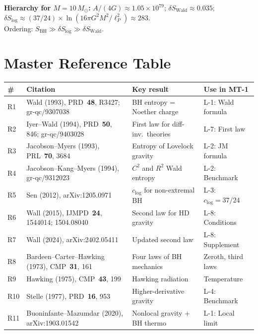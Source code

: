 \documentclass[12pt,a4paper]{article}
\theoremstyle{definition}
\theoremstyle{remark}
\begin{document}
\medskip\noindent
\textbf{Hierarchy for $M = 10\,M_\odot$:}
$A/(4G) \approx 1.05 \times 10^{79}$;\quad
$\delta S_{\mathrm{Wald}} \approx 0.035$;\quad
$\delta S_{\log} \approx (37/24) \times \ln(16\pi G^2 M^2/\ell_P^2)
\approx 283$.\\
Ordering: $S_{\mathrm{BH}} \gg \delta S_{\log} \gg
\delta S_{\mathrm{Wald}}$.


\section{Master Reference Table}
\label{sec:refs}

\begin{center}
\begin{longtable}{p{0.7cm}p{5.5cm}p{3.5cm}p{3.8cm}}
\toprule
\textbf{\#} & \textbf{Citation} & \textbf{Key result}
  & \textbf{Use in MT-1} \\
\midrule
\endhead
R1 & Wald (1993), PRD~\textbf{48}, R3427; gr-qc/9307038
  & BH entropy = Noether charge
  & L-1: Wald formula \\
R2 & Iyer--Wald (1994), PRD~\textbf{50}, 846; gr-qc/9403028
  & First law for diff-inv.\ theories
  & L-7: First law \\
R3 & Jacobson--Myers (1993), PRL~\textbf{70}, 3684
  & Entropy of Lovelock gravity
  & L-2: JM formula \\
R4 & Jacobson--Kang--Myers (1994), gr-qc/9312023
  & $C^2$ and $R^2$ Wald entropy
  & L-2: Benchmark \\
R5 & Sen (2012), arXiv:1205.0971
  & $c_{\log}$ for non-extremal BH
  & L-3: $c_{\log} = 37/24$ \\
R6 & Wall (2015), IJMPD~\textbf{24}, 1544014; 1504.08040
  & Second law for HD gravity
  & L-8: Conditions \\
R7 & Wall (2024), arXiv:2402.05411
  & Updated second law
  & L-8: Supplement \\
R8 & Bardeen--Carter--Hawking (1973), CMP~\textbf{31}, 161
  & Four laws of BH mechanics
  & Zeroth, third laws \\
R9 & Hawking (1975), CMP~\textbf{43}, 199
  & Hawking radiation
  & Temperature \\
R10 & Stelle (1977), PRD~\textbf{16}, 953
  & Higher-derivative gravity
  & L-4: Benchmark \\
R11 & Buoninfante--Mazumdar (2020), arXiv:1903.01542
  & Nonlocal gravity + BH thermo
  & L-1: Local limit \\

\end{longtable}
\end{center}
\end{document}
